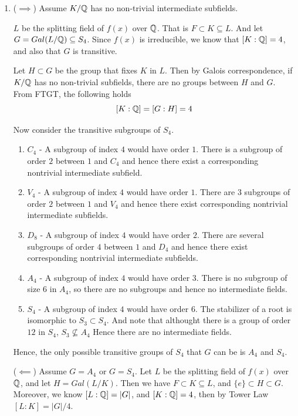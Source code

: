 \documentclass[12pt]{article}
\begin{document}
\begin{solution}
    \bbni
    \begin{enumerate}
        \item [(a)] ($\implies$) Assume $K/\mathbb Q$ has no non-trivial intermediate subfields. 
        
        $L$ be the splitting field of $f(x)$ over $\mathbb Q$. That is $F \subset K \subseteq L$. And let $G = Gal(L/\mathbb Q) \subseteq S_4$.
        Since $f(x)$ is irreducible, we know that $[K:\mathbb Q] =4$, and also that $G$ is transitive. 
        
        Let $H \subset G$ be the group that fixes $K$ in $L$. Then by Galois correspondence, if $K/\mathbb Q$ has no non-trivial subfields, there are no groups between $H$ and $G$. From FTGT, the following holds 
        \[[K:\mathbb Q] = [G:H] = 4\]  

        Now consider the transitive subgroups of $S_4$. 
        \begin{enumerate}
            \item [(i)] $C_4$ - A subgroup of index $4$ would have order $1$. There is a subgroup of order $2$ between ${1}$ and $C_4$ and hence there exist a corresponding nontrivial intermediate subfield. 
            \item [(ii)] $V_4$ - A subgroup of index $4$ would have order $1$. There are $3$ subgroups of order $2$ between ${1}$ and $V_4$ and hence there exist corresponding nontrivial intermediate subfields. 
            \item [(iii)] $D_8$ - A subgroup of index $4$ would have order $2$. There are several subgroups of order $4$ between ${1}$ and $D_4$ and hence there exist corresponding nontrivial intermediate subfields. 
            \item [(iv)] $A_4$ - A subgroup of index $4$ would have order $3$. There is no subgroup of size $6$ in $A_4$, so there are no subgroups and hence no intermediate fields. 
            \item [(v)] $S_4$ - A subgroup of index $4$ would have order $6$. The stabilizer of a root is isomorphic to $S_3 \subset S_4$. And note that althought there is a group of order $12$ in $S_4$, $S_3 \not \subseteq A_4$ Hence there are no intermediate fields. 
        \end{enumerate}

        Hence, the only possible transitive groups of $S_4$ that $G$ can be is $A_4$ and $S_4$. 

        \bbni 

        ($\impliedby$) Assume $G= A_4$ or $G = S_4$. Let $L$ be the splitting field of $f(x)$ over $\mathbb Q$, and let $H = Gal(L/K)$. Then we have $F \subset K \subseteq L$, and $\{e\} \subset H \subset G$. Moreover, we know $[L:\mathbb Q] = |G|$, and $[K:\mathbb Q] = 4$, then by Tower Law $[L:K] = |G|/4$.
        

\end{enumerate}
\end{solution}
\end{document}
